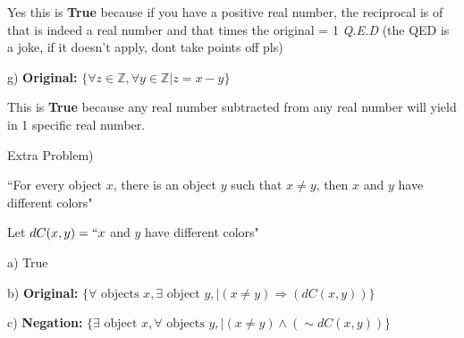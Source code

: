 \documentclass[11pt]{article}
\begin{document}
\begin{flushleft}
Yes this is \textbf{True} because if you have a positive real number, the reciprocal is of that is indeed a real number and that times the original = 1 \textit{Q.E.D} (the QED is a joke, if it doesn't apply, dont take points off pls)

g) \textbf{Original: }$\{\forall z\in \mathbb{Z}, \forall y \in \mathbb{Z} | z = x-y \}$

This is \textbf{True} because any real number subtracted from any real number will yield in 1 specific real number. 

\hrulefill

Extra Problem)

``For every object $x$, there is an object $y$ such that $x\neq y$, then $x$ and $y$  have different colors"

Let $dC(x,y) = ``x $ and $y$ have different colors"

a) True
 
b) \textbf{Original: }$\{\forall \text{ objects } x, \exists \text{ object } y, | (x\neq y) \Rightarrow (dC(x,y))\}$

c) \textbf{Negation: }$\{ \exists \text{ object } x, \forall \text{ objects } y, | (x\neq y)\land (\sim dC(x,y)) \} $







\hrulefill
\end{flushleft}
\end{document}
